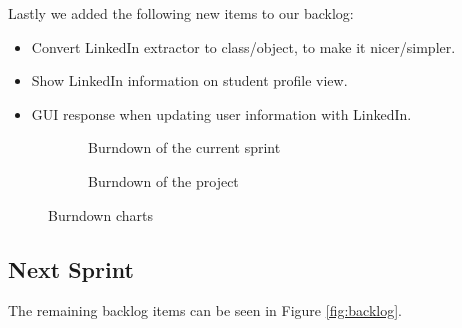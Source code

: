 Lastly we added the following new items to our backlog:
\begin{itemize}
    \item Convert LinkedIn extractor to class/object, to make it nicer/simpler.
    \item Show LinkedIn information on student profile view.
    \item GUI response when updating user information with LinkedIn.
\end{itemize}
\begin{figure}[!ht]
    \centering
    \begin{subfigure}[b]{0.5\textwidth}
        \scalebox{.6}{}
        \caption{Burndown of the current sprint}
        \label{fig:burndownSprint}
    \end{subfigure}%
    \begin{subfigure}[b]{0.5\textwidth}
        \scalebox{.7}{}
        \caption{Burndown of the project}
        \label{fig:burndownProject}
    \end{subfigure}
    \caption{Burndown charts}
    \label{fig:burndown}
\end{figure}

\subsection{Next Sprint}
The remaining backlog items can be seen in Figure \ref{fig:backlog}.

